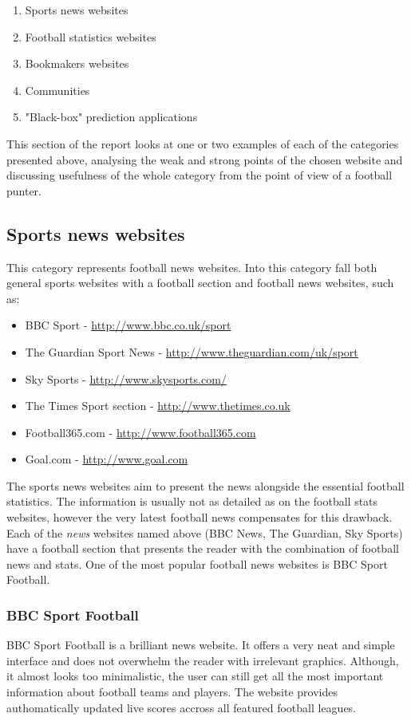 \begin{enumerate}
	\item Sports news websites
	\item Football statistics websites
	\item Bookmakers websites 
	\item Communities 
	\item "Black-box" prediction applications
\end{enumerate}

This section of the report looks at one or two examples of each of the categories presented above, analysing the weak and strong points of the chosen website and discussing usefulness of the whole category from the point of view of a football punter.
	
\subsection{Sports news websites}
\label{subsec:sportsnewswebsites_req}
This category represents football news websites. Into this category fall both general sports websites with a football section and football news websites, such as:
	
\begin{itemize}
	 \item BBC Sport - \url{http://www.bbc.co.uk/sport}
	 \item The Guardian Sport News - \url{http://www.theguardian.com/uk/sport}
	 \item Sky Sports - \url{http://www.skysports.com/}
	 \item The Times Sport section - \url{http://www.thetimes.co.uk}
	 \item Football365.com - \url{http://www.football365.com}
	 \item Goal.com - \url{http://www.goal.com}
\end{itemize}

The sports news websites aim to present the news alongside the essential football statistics. The information is usually not as detailed as on the football stats websites, however the very latest football news compensates for this drawback. Each of the \emph{news} websites named above (BBC News, The Guardian, Sky Sports) have a football section that presents the reader with the combination of football news and stats.  One of the most popular football news websites is BBC Sport Football.
	
\subsubsection{BBC Sport Football}
\label{subsubsec:bbcsportfootball_req}
BBC Sport Football is a brilliant news website. It offers a very neat and simple interface and does not overwhelm the reader with irrelevant graphics. Although, it almost looks too minimalistic, the user can still get all the most important information about football teams and players. The website provides authomatically updated live scores accross all featured football leagues.

